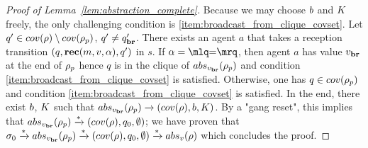 \begin{proof}[Proof of Lemma~\ref{lem:abstraction_complete}]
	Because we may choose $\boss$ and $\clique$ freely, the only challenging condition is \ref{item:broadcast_from_clique_covset}.
	Let $q' \in \statesin{\run} \setminus \statesin{\run_p}$, $q' \ne q_{\textbf{br}}'$. 
	There exists an agent $a$ that takes a reception transition $(q,\textbf{rec}(m, v, \alpha),q')$ in $s$. 
	If $\anact = \quotemarks{\eqtestact}$, then agent $a$ has value $v_{\textbf{br}}$ at the end of $\rho_p$ hence $q$ is in the clique of $\absproj{\avalbr}{\run_p}$ and condition \ref{item:broadcast_from_clique_covset} is satisfied. Otherwise, one has $q \in \statesin{\run_p}$ and condition \ref{item:broadcast_from_clique_covset} is satisfied.
	In the end, there exist $\boss$, $\clique$ such that $\absproj{\avalbr}{\run_p} \step{} (\statesin{\run}, \boss,\clique)$. By a "gang reset", this implies that $\absproj{\avalbr}{\run_p} \step{*} (\statesin{\run}, q_0, \emptyset)$; we have proven that $\aconfiginit \step{*}\absproj{\avalbr}{\run_p} \step{*} (\statesin{\run}, q_0, \emptyset) \step{*} \absproj{\aval}{\run}$ which concludes the proof. 
\end{proof}
\fi
